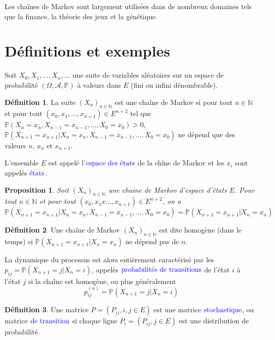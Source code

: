 \documentclass[
]{book}
\newtheorem{proposition}{Proposition}[chapter]
\theoremstyle{definition}
\newtheorem{definition}{Définition}[chapter]
\theoremstyle{definition}
\theoremstyle{definition}
\theoremstyle{remark}
\begin{document}
Les chaînes de Markov sont largement utilisées dans de nombreux domaines tels que la finance, la théorie des jeux et la génétique.

\hypertarget{duxe9finitions-et-exemples}{%
\section{Définitions et exemples}\label{duxe9finitions-et-exemples}}

Soit \(X_0, X_1,\ldots, X_n, \ldots\) une suite de variables aléatoires sur un espace de probabilité \((\Omega,\mathcal{A}, \mathbb{P})\) à valeurs dans \(E\) (fini ou infini dénombrable).

\begin{definition}
\protect\hypertarget{def:unnamed-chunk-35}{}{\label{def:unnamed-chunk-35} }La suite \((X_n)_{n \in \mathbb{N}}\) est une chaîne de Markov si pour tout \(n \in \mathbb{N}\) et pour tout \((x_0,x_1, \ldots,x_{n+1}) \in E^{n+2}\) tel que \(\mathbb{P}(X_n=x_n, X_{n-1}=x_{n-1},\ldots, X_0=x_0) >0\), \(\mathbb{P}(X_{n+1}=x_{n+1}|X_n=x_n,X_{n-1}=x_{n-1},\ldots, X_0=x_0)\) ne dépend que des valeurs \(n\), \(x_n\) et \(x_{n+1}\).
\end{definition}
L'ensemble \(E\) est appelé l'\(\color{blue}{\mathbf{\text{espace des états}}}\) de la chîne de Markov et les \(x_i\) sont appelés \(\color{blue}{\mathbf{\text{états}}}\).
\begin{proposition}
\protect\hypertarget{prp:unnamed-chunk-36}{}{\label{prp:unnamed-chunk-36} }Soit \((X_n)_{n \in \mathbb{N}}\) une chaine de Markov d'espace d'états \(E\). Pour tout \(n \in \mathbb{N}\) et pour tout \((x_0,x_1x\ldots,x_{n+1})\in E^{n+2}\), on a
\[\mathbb{P}(X_{n+1}=x_{n+1}|X_n=x_n,X_{n-1}=x_{n-1},\ldots, X_0=x_0)=\mathbb{P}(X_{n+1}=x_{n+1}|X_n=x_n)\]
\end{proposition}

\begin{definition}
\protect\hypertarget{def:unnamed-chunk-37}{}{\label{def:unnamed-chunk-37} }Une chaîne de Markov \((X_n)_{n \in \mathbb{N}}\) est dite homogène (dans le temps) si \(\mathbb{P}(X_{n+1}=x_{n+1}|X_n=x_n)\) ne dépend pas de \(n\).
\end{definition}

La dynamique du processus est alors entièrement caractérisé par les \(p_{ij}=\mathbb{P}(X_{n+1}=j|X_n=i)\), appelés \(\color{blue}{\mathbf{\text{probabilités de transitions}}}\) de l'état \(i\) à l'état \(j\) si la chaîne est homogène, ou plus généralement
\[ p_{ij}^{(n)}=\mathbb{P}(X_{n+1}=j|X_n=i)\]
\begin{definition}
\protect\hypertarget{def:unnamed-chunk-38}{}{\label{def:unnamed-chunk-38} }Une matrice \(P=(P_{ij},i,j \in E)\) est une matrice \(\color{blue}{\mathbf{\text{stochastique}}}\), ou matrice \(\color{blue}{\mathbf{\text{de transition}}}\) si chaque ligne \(P_i=(P_{ij}, j \in E)\) est une distribution de probabilité.
\end{definition}
\end{document}
